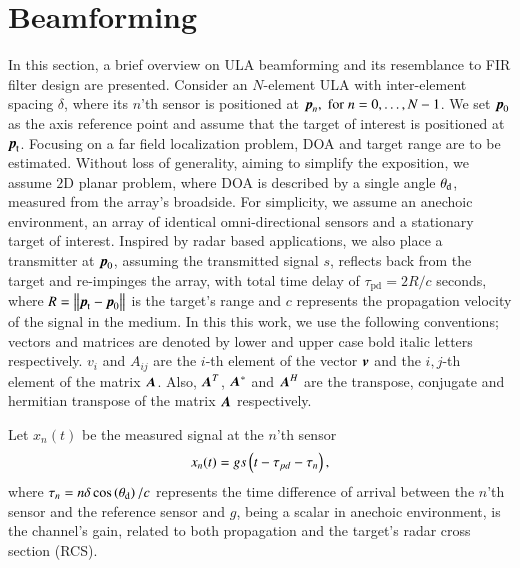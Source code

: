 \section{Beamforming}\label{sec:setup}
In this section, a brief overview on ULA beamforming and its resemblance to FIR filter design are presented.
Consider an $N$-element ULA with inter-element spacing $\delta$, where its $n$'th sensor is positioned at $\boldsymbol{p}_{n},\;\text{for}\; n=0,\ldots,N-1$. We set $\boldsymbol{p}_{0}$ as the axis reference point and assume that the target of interest is positioned at $\boldsymbol{p}_{\text{t}}$.
Focusing on a far field localization problem, DOA and target range are to be estimated. Without loss of generality, aiming to simplify the exposition, we assume $2\text{D}$ planar problem, where DOA is described by a single angle $\theta_{\text{d}}$, measured from the array's broadside.
For simplicity, we assume an anechoic environment, an array of identical omni-directional sensors and a stationary target of interest.
Inspired by radar based applications, we also place a transmitter at $\boldsymbol{p}_{0}$, assuming the transmitted signal $s$, reflects back from the target and re-impinges the array, with total time delay of $\tau_{\text{pd}}=2R/c$ seconds, where $R = \left\Vert\boldsymbol{p}_{\text{t}}-\boldsymbol{p}_{0}\right\Vert$ is the target's range and $c$ represents the propagation velocity of the signal in the medium.
In this this work, we use the following conventions; vectors and matrices are denoted by lower and upper case bold italic letters respectively. 
$v_{i}$ and $A_{ij}$ are the $i$-th element of the vector $\boldsymbol{v}$ and the $i,j$-th element of the matrix $\boldsymbol{A}$.
Also, $\boldsymbol{A}^{T}$, $\boldsymbol{A}^{*}$ and $\boldsymbol{A}^{H}$ are the transpose, conjugate and hermitian transpose of the matrix $\boldsymbol{A}$ respectively.
\par Let $x_{n}(t)$ be the measured signal at the $n$'th sensor
\begin{equation}
x_{n}(t) = gs\Brack{t-\tau_{pd}-\tau_{n}},
\label{eqn:noFeedbackULA_singleSensor_temporal}
\end{equation}
where $\tau_{n}=n\delta\cos\left({\theta_{\text{d}}}\right)/c$ represents the time difference of arrival between the $n$'th sensor and the reference sensor and $g$, being a scalar in anechoic environment, is the channel's gain, related to both propagation and the target's radar cross section (RCS).
